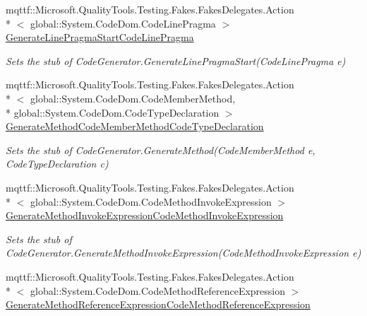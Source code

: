 \begin{DoxyCompactItemize}
mqttf\-::\-Microsoft.\-Quality\-Tools.\-Testing.\-Fakes.\-Fakes\-Delegates.\-Action\\*
$<$ global\-::\-System.\-Code\-Dom.\-Code\-Line\-Pragma $>$ \hyperlink{class_system_1_1_code_dom_1_1_compiler_1_1_fakes_1_1_stub_code_compiler_af46d11ec4ff2a6508b0e0e33ccde69f6}{Generate\-Line\-Pragma\-Start\-Code\-Line\-Pragma}
\begin{DoxyCompactList}\small\item\em Sets the stub of Code\-Generator.\-Generate\-Line\-Pragma\-Start(\-Code\-Line\-Pragma e)\end{DoxyCompactList}\item 
mqttf\-::\-Microsoft.\-Quality\-Tools.\-Testing.\-Fakes.\-Fakes\-Delegates.\-Action\\*
$<$ global\-::\-System.\-Code\-Dom.\-Code\-Member\-Method, \\*
global\-::\-System.\-Code\-Dom.\-Code\-Type\-Declaration $>$ \hyperlink{class_system_1_1_code_dom_1_1_compiler_1_1_fakes_1_1_stub_code_compiler_a698dd5bebb165898782078cf9464aee8}{Generate\-Method\-Code\-Member\-Method\-Code\-Type\-Declaration}
\begin{DoxyCompactList}\small\item\em Sets the stub of Code\-Generator.\-Generate\-Method(\-Code\-Member\-Method e, Code\-Type\-Declaration c)\end{DoxyCompactList}\item 
mqttf\-::\-Microsoft.\-Quality\-Tools.\-Testing.\-Fakes.\-Fakes\-Delegates.\-Action\\*
$<$ global\-::\-System.\-Code\-Dom.\-Code\-Method\-Invoke\-Expression $>$ \hyperlink{class_system_1_1_code_dom_1_1_compiler_1_1_fakes_1_1_stub_code_compiler_a74cc3bd8f077b944398f4c947461575e}{Generate\-Method\-Invoke\-Expression\-Code\-Method\-Invoke\-Expression}
\begin{DoxyCompactList}\small\item\em Sets the stub of Code\-Generator.\-Generate\-Method\-Invoke\-Expression(\-Code\-Method\-Invoke\-Expression e)\end{DoxyCompactList}\item 
mqttf\-::\-Microsoft.\-Quality\-Tools.\-Testing.\-Fakes.\-Fakes\-Delegates.\-Action\\*
$<$ global\-::\-System.\-Code\-Dom.\-Code\-Method\-Reference\-Expression $>$ \hyperlink{class_system_1_1_code_dom_1_1_compiler_1_1_fakes_1_1_stub_code_compiler_a8233dfdb683b34fc33c5d1a4e0f50031}{Generate\-Method\-Reference\-Expression\-Code\-Method\-Reference\-Expression}

\end{DoxyCompactItemize}
